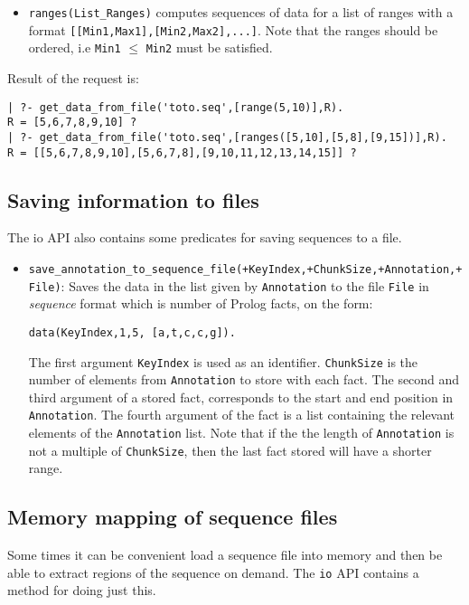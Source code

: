 \documentclass{book}
\begin{document}
\begin{itemize}
\begin{itemize}
\item \verb+ranges(List_Ranges)+ computes sequences of data for a list of ranges with a format \verb+[[Min1,Max1],[Min2,Max2],...]+.
Note that the ranges should be ordered, i.e \verb+Min1+ $\leq$ \verb+Min2+ must be satisfied.
\end{itemize}           
Result of the request is:
\begin{verbatim}
| ?- get_data_from_file('toto.seq',[range(5,10)],R).
R = [5,6,7,8,9,10] ?
| ?- get_data_from_file('toto.seq',[ranges([5,10],[5,8],[9,15])],R).
R = [[5,6,7,8,9,10],[5,6,7,8],[9,10,11,12,13,14,15]] ?
\end{verbatim}
\end{itemize}

\subsection{Saving information to files}

The io API also contains some predicates for saving sequences to a
file. 

\begin{itemize}
\item
  \texttt{save\_annotation\_to\_sequence\_file(+KeyIndex,+ChunkSize,+Annotation,+File)}: 
Saves the data in the list given by \texttt{Annotation} to the file
\texttt{File} in \emph{sequence} format which is number of Prolog facts, on
the form:
\begin{verbatim}
data(KeyIndex,1,5, [a,t,c,c,g]).
\end{verbatim}
The first argument \texttt{KeyIndex} is used as an identifier. \texttt{ChunkSize} is the
number of elements from \texttt{Annotation} to store with each
fact. The second and third argument of a stored fact, corresponds to
the start and end position in \texttt{Annotation}. The fourth
argument of the fact is a list containing the relevant elements of the
\texttt{Annotation} list. Note that if the the length of
\texttt{Annotation} is not a multiple of \texttt{ChunkSize}, then the
last fact stored will have a shorter range.
\end{itemize}

\subsection{Memory mapping of sequence files}

Some times it can be convenient load a sequence file into memory and then be able
to extract regions of the sequence on demand. The \texttt{io} API contains a method for
doing just this.
\end{document}
